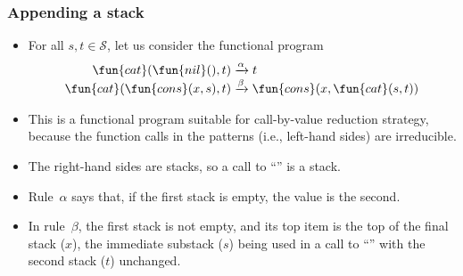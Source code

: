\documentclass[compress,dvips,xcolor={dvipsnames},t]{beamer}
\begin{document}
\begin{frame}
  \frametitle{Appending a stack}

  \begin{itemize}

    \item For all \(s, t \in \mathcal{S}\), let us consider the
      functional program
      \begin{align*}
        \fun{cat}(\fun{nil}(),t) &\xrightarrow{\alpha} t\\
        \fun{cat}(\fun{cons}(x,s),t) &\xrightarrow{\smash\beta}
        \fun{cons}(x,\fun{cat}(s,t))
      \end{align*}

    \item This is a functional program suitable for
      call\hyp{}by\hyp{}value reduction strategy, because the function
      calls in the patterns (i.e., left\hyp{}hand sides) are
      irreducible.

    \item The right\hyp{}hand sides are stacks, so a call to
      ``'' is a stack.

    \item Rule~\(\alpha\) says that, if the first stack is empty, the
      value is the second.

    \item In rule~\(\beta\), the first stack is not empty, and its top
      item is the top of the final stack (\(x\)), the immediate
      substack (\(s\)) being used in a call to ``'' with the
      second stack (\(t\)) unchanged.

  \end{itemize}

\end{frame}
\end{document}
